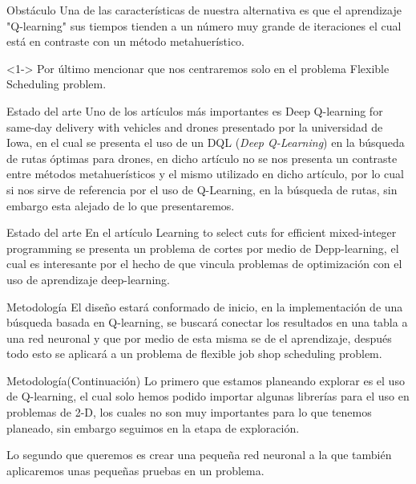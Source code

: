 \documentclass{beamer}
\begin{document}
\begin{frame}{Obstáculo}
    Una de las características de nuestra alternativa es que el aprendizaje "Q-learning" sus tiempos tienden a un número muy grande de iteraciones el cual está en contraste con un método metahuerístico.

    \begin{block}<1->{}
        Por último mencionar que nos centraremos  solo en el problema  Flexible Scheduling problem.
    \end{block}
\end{frame}

\begin{frame}{Estado del arte}
Uno de los artículos más importantes es Deep Q-learning for same-day delivery with vehicles and drones \cite{CHEN2022939} presentado por la universidad de Iowa, en el cual se presenta el uso de un DQL (\textit{Deep Q-Learning}) en la búsqueda de rutas óptimas para drones, en dicho artículo no se nos presenta un contraste entre métodos metahuerísticos y el mismo utilizado en dicho artículo, por lo cual si nos sirve de referencia por el uso de Q-Learning, en la búsqueda de rutas, sin embargo esta alejado de lo que presentaremos.
\end{frame}

\begin{frame}{Estado del arte}
	En el artículo Learning to select cuts for efficient mixed-integer programming \cite{HUANG2022108353} se presenta un problema de cortes por medio de Depp-learning, el cual es interesante por el hecho de que vincula problemas de optimización con el uso de aprendizaje deep-learning.
\end{frame}

\begin{frame}{Metodología}
    El diseño estará conformado de inicio, en la implementación de una búsqueda basada en Q-learning, se buscará conectar los resultados en una tabla a  una red neuronal y que por medio de esta misma se de el aprendizaje, después todo esto se aplicará a un problema de flexible job shop scheduling problem.
\end{frame}

\begin{frame}{Metodología}{(Continuación)}
    Lo primero que estamos planeando explorar es el uso de Q-learning, el cual solo hemos podido importar algunas librerías para el uso en problemas de 2-D, los cuales no son muy importantes para lo que tenemos planeado, sin embargo seguimos en la etapa de exploración. \newline

    Lo segundo que queremos es crear una pequeña red neuronal a la que también aplicaremos unas pequeñas pruebas en un problema.
\end{frame}
\end{document}
